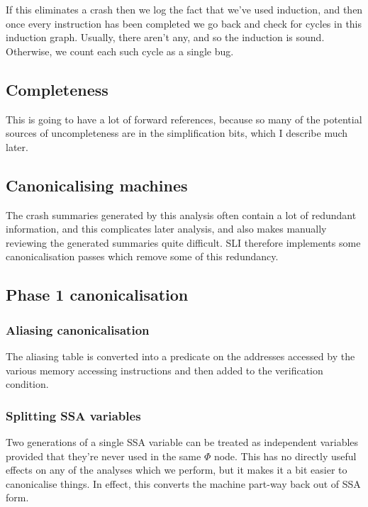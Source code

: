 If this eliminates a crash then we log the fact that we've used induction, and then once every instruction has been completed we go back and check for cycles in this induction graph.
Usually, there aren't any, and so the induction is sound.
Otherwise, we count each such cycle as a single bug.



\subsection{Completeness}
This is going to have a lot of forward references, because so many of the potential sources of uncompleteness are in the simplification bits, which I describe much later.

\subsection{Canonicalising machines}

The crash summaries generated by this analysis often contain a lot of redundant information, and this complicates later analysis, and also makes manually reviewing the generated summaries quite difficult.
SLI therefore implements some canonicalisation passes which remove some of this redundancy.


\subsection{Phase 1 canonicalisation}
\subsubsection{Aliasing canonicalisation}
The aliasing table is converted into a predicate on the addresses accessed by the various memory accessing instructions and then added to the verification condition.

\subsubsection{Splitting SSA variables}
Two generations of a single SSA variable can be treated as independent variables provided that they're never used in the same $\Phi$ node.
This has no directly useful effects on any of the analyses which we perform, but it makes it a bit easier to canonicalise things.
In effect, this converts the machine part-way back out of SSA form.

